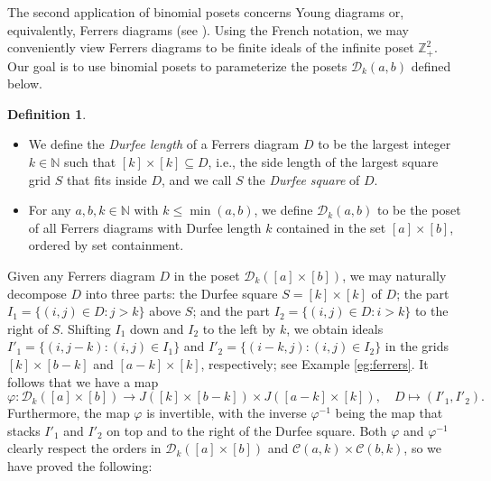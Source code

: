 \documentclass[11pt]{amsart}
\theoremstyle{plain}
\theoremstyle{definition}
\newtheorem{definition}[theorem]{Definition}
\theoremstyle{remark}
\numberwithin{equation}{section}
\newcommand{\Z}{{\mathbb Z}}
\newcommand{\ra}{\rightarrow}
\newcommand{\N}{\mathbb{N}}
\newcommand{\calc}{\mathcal{C}}
\newcommand{\cald}{\mathcal{D}}
\newcommand{\dkab}{\mathcal{D}_k([a]\times[b])}
\newcommand{\se}{\subseteq}
\newcommand{\inverse}{^{-1}}
\begin{document}


The second application of binomial posets concerns Young diagrams or,
equivalently, Ferrers diagrams (see \cite[\S 1.7]{EC1}). Using the French
notation, we may conveniently view Ferrers diagrams to be finite ideals of the
infinite poset $\Z_+^2$.  Our goal is to use binomial posets to parameterize the
posets $\cald_k(a,b)$ defined below. 

\begin{definition}
\label{def:Durfee}
\begin{itemize}
\item[{\rm (i)}]
We define the \emph{Durfee length} of a Ferrers diagram $D$ to be the largest
integer $k\in \N$ such that $[k]\times[k]\se D$, i.e., the side length of the
largest square grid $S$ that fits inside $D$, and we call $S$ the \emph{Durfee
square} of $D$. 
\item[{\rm (ii)}]
For any $a,b,k\in \N$ with $k\le \min(a,b)$, we define $\cald_k(a,b)$ to be the
poset of all Ferrers diagrams with Durfee length $k$ contained in the set
$[a]\times[b]$, ordered by set containment. 
\end{itemize}
\end{definition}

Given any Ferrers diagram $D$ in the poset $\cald_k([a]\times[b])$, we may
naturally decompose $D$ into three parts: the Durfee square $S=[k]\times[k]$ of
$D$; the part $I_1=\{(i,j)\in D: j>k\}$  above $S$; and the part $I_2=\{(i,j)\in
D: i>k\}$ to the right of $S$. Shifting $I_1$ down and $I_2$ to the left by $k$,
we obtain ideals $I'_1=\{(i,j-k):(i,j)\in I_1\}$ and $I'_2=\{(i-k,j):(i,j)\in
I_2\}$ in the grids $[k]\times [b-k]$ and $[a-k]\times [k]$, respectively; see
Example \ref{eg:ferrers}.  It follows that we have a map \[\varphi: \dkab\ra
J([k]\times [b-k])\times J([a-k]\times [k]), \quad D\mapsto (I'_1,I'_2).\]
Furthermore, the map $\varphi$ is invertible, with the inverse $\varphi\inverse$
being the map that stacks $I'_1$ and $I'_2$ on top and to the right of the
Durfee square.  Both $\varphi$ and $\varphi\inverse$ clearly respect the orders
in $\cald_k([a]\times[b])$ and $\calc(a,k)\times\calc(b,k)$, so we have proved
the following:
\end{document}
